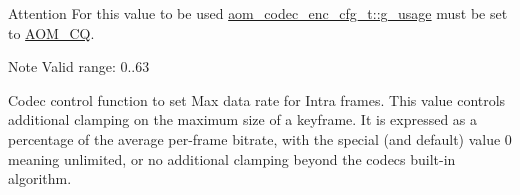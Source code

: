 \begin{Desc}
\begin{description}
\begin{DoxyAttention}{Attention}
For this value to be used \hyperlink{structaom__codec__enc__cfg_a2aef2cdcf97e60ab36f7ca77c028e816}{aom\+\_\+codec\+\_\+enc\+\_\+cfg\+\_\+t\+::g\+\_\+usage} must be set to \hyperlink{group__encoder_gga7c084d3ecef569aad166ce70b0e8a957a70aa1f15e91f6576ba3e63879947be64}{A\+O\+M\+\_\+\+CQ}. 
\end{DoxyAttention}
\begin{DoxyNote}{Note}
Valid range\+: 0..63 
\end{DoxyNote}
\item[{\em 
A\+O\+M\+E\+\_\+\+S\+E\+T\+\_\+\+M\+A\+X\+\_\+\+I\+N\+T\+R\+A\+\_\+\+B\+I\+T\+R\+A\+T\+E\+\_\+\+P\+CT\hypertarget{group__aom__encoder_ggae78dde67a6d78f332e9bdba0dde42db5a9e1965ffa40d2d87556b65748c63adcc}{}\label{group__aom__encoder_ggae78dde67a6d78f332e9bdba0dde42db5a9e1965ffa40d2d87556b65748c63adcc}
}]Codec control function to set Max data rate for Intra frames. This value controls additional clamping on the maximum size of a keyframe. It is expressed as a percentage of the average per-\/frame bitrate, with the special (and default) value 0 meaning unlimited, or no additional clamping beyond the codec\textquotesingle{}s built-\/in algorithm.


\end{description}
\end{Desc}
